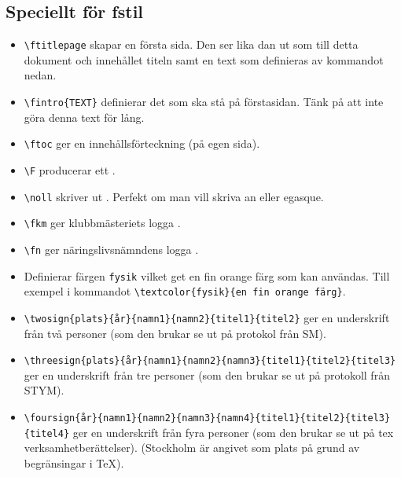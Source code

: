 \documentclass[a4paper]{article}
\newcommand{\bs}{\textbackslash}
\begin{document}
\subsection{Speciellt för fstil}
\begin{itemize}
\item \texttt{\bs ftitlepage} skapar en första sida. Den ser lika dan ut som till detta dokument och innehållet titeln samt en text som definieras av kommandot nedan.
\item \texttt{\bs fintro\{TEXT\}} definierar det som ska stå på förstasidan. Tänk på att inte göra denna text för lång.
\item \texttt{\bs ftoc} ger en innehållsförteckning (på egen sida).
\item \texttt{\bs F} producerar ett \F.
\item \texttt{\bs noll} skriver ut \noll. Perfekt om man vill skriva \noll an eller \noll egasque.
\item \texttt{\bs fkm} ger klubbmästeriets logga \fkm.
\item \texttt{\bs fn} ger näringslivsnämndens logga \fn.
\item Definierar färgen \texttt{fysik} vilket get \textcolor{fysik}{en fin orange färg} som kan användas. Till exempel i kommandot \texttt{\bs textcolor\{fysik\}\{en fin orange färg\}}.
\item \texttt{\bs twosign\{plats\}\{år\}\{namn1\}\{namn2\}\{titel1\}\{titel2\}} ger en underskrift från två personer (som den brukar se ut på protokol från SM). {\tiny
{}
}
\item \texttt{\bs threesign\{plats\}\{år\}\{namn1\}\{namn2\}\{namn3\}\{titel1\}\{titel2\}\{titel3\}} ger en underskrift från tre personer (som den brukar se ut på protokoll från STYM).
\item \texttt{\bs foursign\{år\}\{namn1\}\{namn2\}\{namn3\}\{namn4\}\{titel1\}\{titel2\}\{titel3\}\{titel4\}} ger en underskrift från fyra personer (som den brukar se ut på tex verksamhetberättelser). (Stockholm är angivet som plats på grund av begränsingar i \TeX).
\end{itemize}
\end{document}
